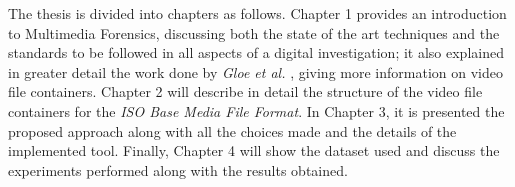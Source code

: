 The thesis is divided into chapters as follows. Chapter 1 provides an introduction to Multimedia Forensics, discussing both the state of the art techniques and the standards to be followed in all aspects of a digital investigation; it also explained in greater detail the work done by \emph{Gloe et al.} \cite{Gloe2014S68}, giving more information on video file containers. Chapter 2 will describe in detail the structure of the video file containers for the \emph{ISO Base Media File Format}. In Chapter 3, it is presented the proposed approach along with all the choices made and the details of the implemented tool. Finally, Chapter 4 will show the dataset used and discuss the experiments performed along with the results obtained.